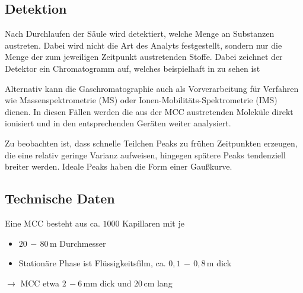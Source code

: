 \subsection{Detektion}
Nach Durchlaufen der Säule wird detektiert, welche Menge an Substanzen austreten. Dabei wird nicht die Art des Analyts festgestellt, sondern nur die Menge der zum jeweiligen Zeitpunkt austretenden Stoffe. Dabei zeichnet der Detektor ein Chromatogramm auf, welches beispielhaft in  zu sehen ist

Alternativ kann die Gaschromatographie auch als Vorverarbeitung für Verfahren wie Massenspektrometrie (MS) oder Ionen-Mobilitäts-Spektrometrie (IMS) dienen. In diesen Fällen werden die aus der MCC austretenden Moleküle direkt ionisiert und in den entsprechenden Geräten weiter analysiert.

%

Zu beobachten ist, dass schnelle Teilchen Peaks zu frühen Zeitpunkten erzeugen, die eine relativ geringe Varianz aufweisen, hingegen spätere Peaks tendenziell breiter werden. Ideale Peaks haben die Form einer Gaußkurve.


\subsection{Technische Daten}
Eine MCC besteht aus ca. $1000$ Kapillaren mit je
\begin{itemize}
 \item $20\,-\,80$\,\textmu m Durchmesser
 \item Stationäre Phase ist Flüssigkeitsfilm, ca. $0,1\,-\,0,8$\,\textmu m dick
\end{itemize}
 
$\rightarrow$ MCC etwa $2\,-6$\,mm dick und $20$\,cm lang

